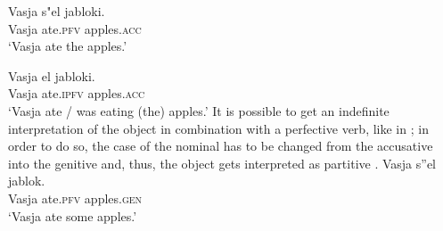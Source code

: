 \documentclass[output=paper,
colorlinks,
citecolor=brown,
newtxmath
]{langscibook}
\begin{document}
\ea \label{ex:seres:4}
\gll Vasja s"el		jabloki.\\
Vasja ate.\textsc{pfv}		apples.\textsc{acc}\\
\glt `Vasja ate the apples.'
\z

\ea \label{ex:seres:5}
\gll	Vasja	el			jabloki.\\
Vasja ate.\textsc{ipfv}  apples.\textsc{acc}\\
\glt `Vasja ate / was eating (the) apples.'
\z
\noindent It is possible to get an indefinite interpretation of the object in combination with a perfective verb, like in ; in order to do so, the case of the nominal has to be changed from the accusative into the genitive and, thus, the object gets interpreted as partitive .   %
\ea \label{ex:seres:6}
\gll Vasja s''el		jablok.\\
Vasja	ate.\textsc{pfv}		apples.\textsc{gen}\\
\glt `Vasja ate some apples.'
\z
\noindent
\noindent
\end{document}
